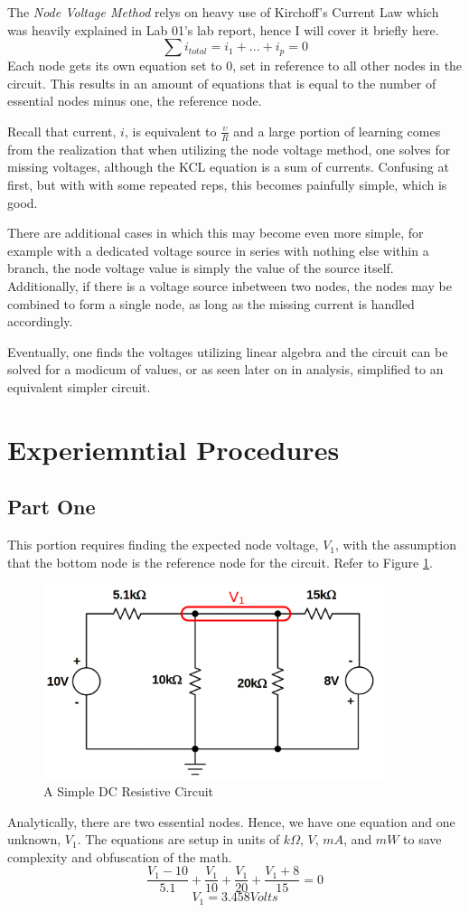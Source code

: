 \documentclass[12pt]{article}
\begin{document}
The \textit{Node Voltage Method} relys on heavy use of Kirchoff's Current Law
which was heavily explained in Lab 01's lab report, hence I will cover it
briefly here.
\[
	\sum i_{total} = i_1 + ... + i_p = 0\]
Each node gets its own equation set to 0, set in reference to all other nodes in
the circuit. This results in an amount of equations that is equal to the number
of essential nodes minus one, the reference node.

Recall that current, $i$, is equivalent to
$\frac{\upsilon}{R}$ and a large portion of learning comes from the realization
that when utilizing the node voltage method, one solves for missing voltages,
although the KCL equation is a sum of currents. Confusing at first, but with
with some repeated reps, this becomes painfully simple, which is good.

There are additional cases in which this may become even more simple, for
example with a dedicated voltage source in series with nothing else within a
branch, the node voltage value is simply the value of the source itself.
Additionally, if there is a voltage source inbetween two nodes, the nodes may be
combined to form a single node, as long as the missing current is handled
accordingly.

Eventually, one finds the voltages utilizing linear algebra and the circuit can
be solved for a modicum of values, or as seen later on in analysis, simplified
to an equivalent simpler circuit.

\section*{Experiemntial Procedures}
\subsection*{Part One}
This portion requires finding the expected node voltage, $V_1$, with the
assumption that the bottom node is the reference node for the circuit. Refer to
Figure \ref{fig:circuit1}.
\begin{figure}[H]
	\centering
	\includegraphics[width=10cm]{06_01}
	\caption{A Simple DC Resistive Circuit}
	\label{fig:circuit1}
\end{figure}
Analytically, there are two essential nodes. Hence, we have one equation and one
unknown, $V_1$.
The equations are setup in units of $k\Omega$, $V$, $mA$, and $mW$ to save
complexity and obfuscation of the math.
\[
	\frac{V_1 - 10}{5.1} + \frac{V_1}{10} + \frac{V_1}{20} + \frac{V_1 + 8}{15} =
	0
\]
\[	V_1 = 3.458 Volts\]
\end{document}
